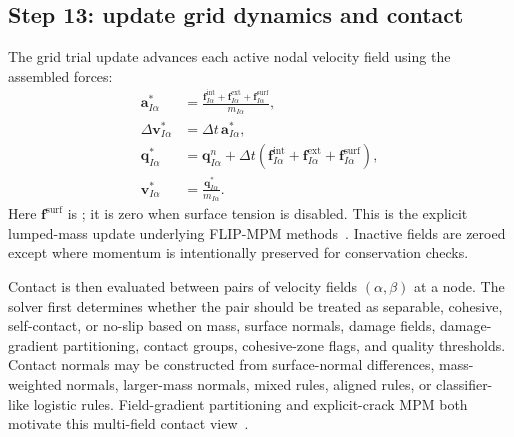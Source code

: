 \subsection{Step 13: update grid dynamics and contact}
\label{subsec:solver-step-13}
The grid trial update advances each active nodal velocity field using the assembled forces:
\begin{align}
  \mathbf{a}_{I\alpha}^{\ast} &= \frac{\mathbf{f}^{\mathrm{int}}_{I\alpha}+\mathbf{f}^{\mathrm{ext}}_{I\alpha}+\mathbf{f}^{\mathrm{surf}}_{I\alpha}}{m_{I\alpha}}, \\
  \Delta\mathbf{v}_{I\alpha}^{\ast} &= \Delta t\,\mathbf{a}_{I\alpha}^{\ast}, \\
  \mathbf{q}_{I\alpha}^{\ast} &= \mathbf{q}_{I\alpha}^{n}+\Delta t\left(\mathbf{f}^{\mathrm{int}}_{I\alpha}+\mathbf{f}^{\mathrm{ext}}_{I\alpha}+\mathbf{f}^{\mathrm{surf}}_{I\alpha}\right), \\
  \mathbf{v}_{I\alpha}^{\ast} &= \frac{\mathbf{q}_{I\alpha}^{\ast}}{m_{I\alpha}}.
\end{align}
Here $\mathbf{f}^{\mathrm{surf}}$ is ; it is zero when surface tension is disabled.  This is the explicit lumped-mass update underlying FLIP-MPM methods~\cite{sulsky1994history,wallstedt2008explicit}.  Inactive fields are zeroed except where momentum is intentionally preserved for conservation checks.

Contact is then evaluated between pairs of velocity fields $(\alpha,\beta)$ at a node.  The solver first determines whether the pair should be treated as separable, cohesive, self-contact, or no-slip based on mass, surface normals, damage fields, damage-gradient partitioning, contact groups, cohesive-zone flags, and quality thresholds.  Contact normals may be constructed from surface-normal differences, mass-weighted normals, larger-mass normals, mixed rules, aligned rules, or classifier-like logistic rules.  Field-gradient partitioning and explicit-crack MPM both motivate this multi-field contact view~\cite{nairn2003cramp,homel2016dfg}.

